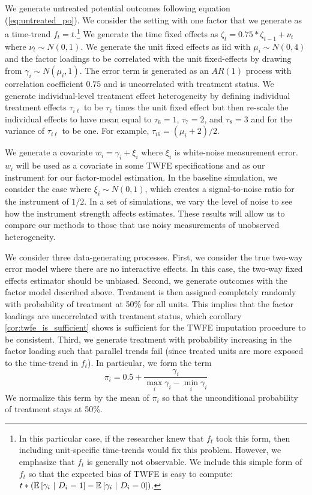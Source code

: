 \documentclass[12pt]{article}
\begin{document}
We generate untreated potential outcomes following equation (\ref{eq:untreated_po}). We consider the setting with one factor that we generate as a time-trend $f_t = t$.\footnote{In this particular case, if the researcher knew that $f_t$ took this form, then including unit-specific time-trends would fix this problem. However, we emphasize that $f_t$ is generally not observable. We include this simple form of $f_t$ so that the expected bias of TWFE is easy to compute: $t * (\mathbb{E}\left[\gamma_i \ \vert \ D_i = 1\right] - \mathbb{E}\left[\gamma_i \ \vert \ D_i = 0 \right])$.} We generate the time fixed effects as $\zeta_t = 0.75 * \zeta_{t-1} + \nu_{t}$ where $\nu_{t} \sim N(0,1)$. We generate the unit fixed effects as iid with $\mu_i \sim N(0, 4)$ and the factor loadings to be correlated with the unit fixed-effects by drawing from $\gamma_i \sim N(\mu_i, 1)$. The error term is generated as an $AR(1)$ process with correlation coefficient $0.75$ and is uncorrelated with treatment status. We generate individual-level treatment effect heterogeneity by defining individual treatment effects $\tau_{i\ell}$ to be $\tau_\ell$ times the unit fixed effect but then re-scale the individual effects to have mean equal to $\tau_6 = 1$, $\tau_7 = 2$, and $\tau_8 = 3$ and for the variance of $\tau_{i\ell}$ to be one. For example, $\tau_{i6} = (\mu_i + 2)/2$. 

We generate a covariate $w_i = \gamma_i + \xi_i$ where $\xi_i$ is white-noise measurement error. $w_i$ will be used as a covariate in some TWFE specifications and as our instrument for our factor-model estimation. In the baseline simulation, we consider the case where $\xi_i \sim N(0, 1)$, which creates a signal-to-noise ratio for the instrument of $1/2$. In a set of simulations, we vary the level of noise to see how the instrument strength affects estimates. These results will allow us to compare our methods to those that use noisy measurements of unobserved heterogeneity.

We consider three data-generating processes. First, we consider the true two-way error model where there are no interactive effects. In this case, the two-way fixed effects estimator should be unbiased. Second, we generate outcomes with the factor model described above. Treatment is then assigned completely randomly with probability of treatment at 50\% for all units. This implies that the factor loadings are uncorrelated with treatment status, which corollary \ref{cor:twfe_is_sufficient} shows is sufficient for the TWFE imputation procedure to be consistent. Third, we generate treatment with probability increasing in the factor loading such that parallel trends fail (since treated units are more exposed to the time-trend in $f_t$). In particular, we form the term
\begin{equation}
\pi_i = 0.5 + \frac{\gamma_{i}}{\max_i \gamma_i - \min_i \gamma_i}
\end{equation}
We normalize this term by the mean of $\pi_i$ so that the unconditional probability of treatment stays at 50\%.
\end{document}
